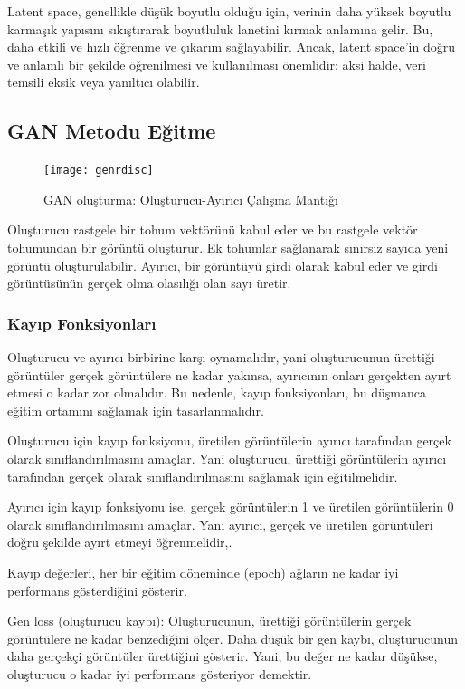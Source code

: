 \documentclass[12pt, a4paper]{article}
\begin{document}
	Latent space, genellikle düşük boyutlu olduğu için, verinin daha yüksek boyutlu karmaşık yapısını sıkıştırarak boyutluluk lanetini kırmak anlamına gelir. Bu, daha etkili ve hızlı öğrenme ve çıkarım sağlayabilir. Ancak, latent space'in doğru ve anlamlı bir şekilde öğrenilmesi ve kullanılması önemlidir; aksi halde, veri temsili eksik veya yanıltıcı olabilir.
	\clearpage
	\subsection{GAN Metodu Eğitme}
	\begin{figure}[h]
		\centering
		\texttt{[image: genrdisc]}
		\label{genrdisc}
		\caption{GAN oluşturma: Oluşturucu-Ayırıcı Çalışma Mantığı\cite{present/youtube/gan/gans_scratch.ipynb-2024-05-01}}
	\end{figure}
	\FloatBarrier
	Oluşturucu rastgele bir tohum vektörünü kabul eder ve bu rastgele vektör tohumundan bir görüntü oluşturur. Ek tohumlar sağlanarak sınırsız sayıda yeni görüntü oluşturulabilir. Ayırıcı, bir görüntüyü girdi olarak kabul eder ve girdi görüntüsünün gerçek olma olasılığı olan sayı üretir.
	
	\subsubsection{Kayıp Fonksiyonları}
	
	Oluşturucu ve ayırıcı birbirine karşı oynamalıdır, yani oluşturucunun ürettiği görüntüler gerçek görüntülere ne kadar yakınsa, ayırıcının onları gerçekten ayırt etmesi o kadar zor olmalıdır. Bu nedenle, kayıp fonksiyonları, bu düşmanca eğitim ortamını sağlamak için tasarlanmalıdır.
	
	Oluşturucu için kayıp fonksiyonu, üretilen görüntülerin ayırıcı tarafından gerçek olarak sınıflandırılmasını amaçlar. Yani oluşturucu, ürettiği görüntülerin ayırıcı tarafından gerçek olarak sınıflandırılmasını sağlamak için eğitilmelidir.
	
	Ayırıcı için kayıp fonksiyonu ise, gerçek görüntülerin 1 ve üretilen görüntülerin 0 olarak sınıflandırılmasını amaçlar. Yani ayırıcı, gerçek ve üretilen görüntüleri doğru şekilde ayırt etmeyi öğrenmelidir\cite{Understanding-2024-05-01},\cite{-2024-05-01}.
	
	Kayıp değerleri, her bir eğitim döneminde (epoch) ağların ne kadar iyi performans gösterdiğini gösterir.
	
	Gen loss (oluşturucu kaybı): Oluşturucunun, ürettiği görüntülerin gerçek görüntülere ne kadar benzediğini ölçer. Daha düşük bir gen kaybı, oluşturucunun daha gerçekçi görüntüler ürettiğini gösterir. Yani, bu değer ne kadar düşükse, oluşturucu o kadar iyi performans gösteriyor demektir.
	
\end{document}
